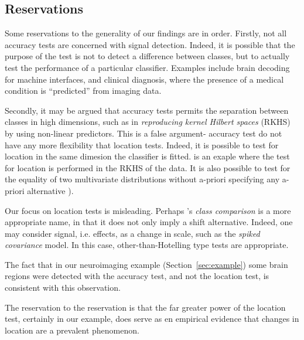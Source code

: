 \documentclass[12pt,a4paper]{article}
\begin{document}




\subsection{Reservations}
\label{sec:reservations}

Some reservations to the generality of our findings are in order. 
Firstly, not all accuracy tests are concerned with signal detection.
Indeed, it is possible that the purpose of the test is not to detect a difference between classes, but to actually test the performance of a particular classifier. 
Examples include brain decoding for machine interfaces, and clinical diagnosis, where the presence of a medical condition is ``predicted'' from imaging data. \citep[e.g.][]{olivetti_induction_2012,wager_fmri-based_2013}

Secondly, it may be argued that accuracy tests permits the separation between classes in high dimensions, such as in \emph{reproducing kernel Hilbert spaces} (RKHS) by using non-linear predictors. 
This is a false argument- accuracy test do not have any more flexibility that location tests. 
Indeed, it is possible to test for location in the same dimesion the classifier is fitted. 
\citet{gretton_kernel_2012-1} is an exaple where the test for location is performed in the RKHS of the data.
It is also possible to test for the equality of two multivariate distributions without a-priori specifying any a-priori alternative \cite[e.g.][]{heller_consistent_2012}).

Our focus on location tests is misleading. Perhaps \cite{simon_pitfalls_2003}'s \emph{class comparison} is a more appropriate name, in that it does not only imply a shift alternative. 
Indeed, one may consider signal, i.e. effects, as a change in scale, such as the \emph{spiked covariance} model. 
In this case, other-than-Hotelling type tests are appropriate.

The fact that in our neuroimaging example (Section~\ref{sec:example}) some brain regions were detected with the accuracy test, and not the location test, is consistent with this observation. 

The reservation to the reservation is that the far greater power of the location test, certainly in our example, does serve as en empirical evidence that changes in location are a prevalent phenomenon. 
\end{document}

